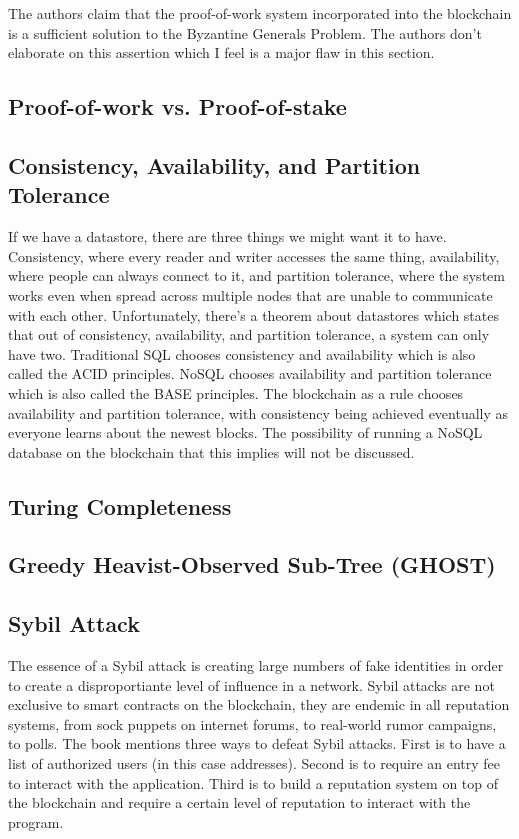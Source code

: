 \documentclass{article}
\begin{document}
The authors claim that the proof-of-work system incorporated into the blockchain is a sufficient solution to the Byzantine Generals Problem. The authors don't elaborate on this assertion which I feel is a major flaw in this section.

\subsection{Proof-of-work vs. Proof-of-stake}

\subsection{Consistency, Availability, and Partition Tolerance}
If we have a datastore, there are three things we might want it to have. Consistency, where every reader and writer accesses
the same thing, availability, where people can always connect to it, and partition tolerance, where the system works even when spread across multiple nodes that are unable to communicate with each other. Unfortunately, there's a theorem about datastores which states that out of consistency, availability, and partition tolerance, a system can only have two. Traditional SQL chooses consistency and availability which is also called the ACID principles. NoSQL chooses availability and partition tolerance which is also called the BASE principles. The blockchain as a rule chooses availability and partition tolerance, with consistency being achieved eventually as everyone learns about the newest blocks. The possibility of running a NoSQL database on the blockchain that this implies will not be discussed.

\subsection{Turing Completeness}

\subsection{Greedy Heavist-Observed Sub-Tree (GHOST)}

\subsection{Sybil Attack}
The essence of a Sybil attack is creating large numbers of fake identities in order to create a disproportiante level of influence
in a network. Sybil attacks are not exclusive to smart contracts on the blockchain, they are endemic in all reputation systems, from
sock puppets on internet forums, to real-world rumor campaigns, to polls. The book mentions three ways to defeat Sybil attacks.
First is to have a list of authorized users (in this case addresses). Second is to require an entry fee to interact with the application.
Third is to build a reputation system on top of the blockchain and require a certain level of reputation to interact with the program.
\end{document}
